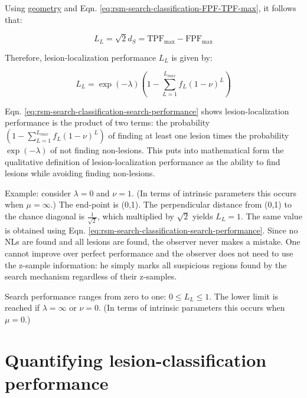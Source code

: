 \documentclass[
]{book}
\begin{document}
Using \href{https://en.wikipedia.org/wiki/Distance_from_a_point_to_a_line\#Line_defined_by_an_equation}{geometry} and Eqn. \eqref{eq:rsm-search-classification-FPF-TPF-max}, it follows that:

\begin{equation} 
L_L=\sqrt{2}d_S=\text{TPF}_{\text{max}}-\text{FPF}_{\text{max}}
\label{eq:rsm-search-classification-perp-distance}
\end{equation}

Therefore, lesion-localization performance \(L_L\) is given by:

\begin{equation} 
L_L=\exp\left ( -\lambda \right )\left (1-\sum_{L=1}^{L_{max}}f_L\left ( 1-\nu  \right )^L  \right )
\label{eq:rsm-search-classification-search-performance}
\end{equation}

Eqn. \eqref{eq:rsm-search-classification-search-performance} shows lesion-localization performance is the product of two terms: the probability \(\left (1-\sum_{L=1}^{L_{max}}f_L\left ( 1-\nu \right )^L \right )\) of finding at least one lesion times the probability \(\exp\left ( -\lambda \right )\) of not finding non-lesions. This puts into mathematical form the qualitative definition of lesion-localization performance as the ability to find lesions while avoiding finding non-lesions.

Example: consider \(\lambda = 0\) and \(\nu = 1\). (In terms of intrinsic parameters this occurs when \(\mu = \infty\).) The end-point is (0,1). The perpendicular distance from (0,1) to the chance diagonal is \(\frac{1}{\sqrt{2}}\), which multiplied by \(\sqrt{2}\) yields \(L_L = 1\). The same value is obtained using Eqn. \eqref{eq:rsm-search-classification-search-performance}. Since no NLs are found and all lesions are found, the observer never makes a mistake. One cannot improve over perfect performance and the observer does not need to use the z-sample information: he simply marks all suspicious regions found by the search mechanism regardless of their z-samples.

Search performance ranges from zero to one: \(0 \le L_L \le 1\). The lower limit is reached if \(\lambda = \infty\) or \(\nu = 0\). (In terms of intrinsic parameters this occurs when \(\mu = 0\).)

\hypertarget{rsm-search-classification-performance}{%
\section{Quantifying lesion-classification performance}\label{rsm-search-classification-performance}}
\end{document}
